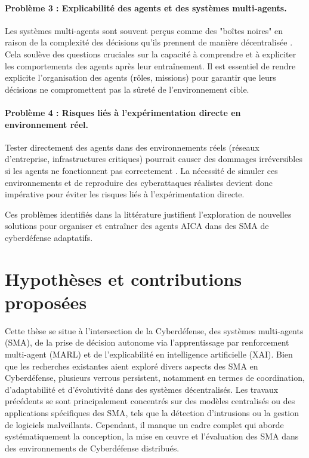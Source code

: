 \paragraph{Problème 3 : Explicabilité des agents et des systèmes multi-agents.}
Les systèmes multi-agents sont souvent perçus comme des "boîtes noires" en raison de la complexité des décisions qu'ils prennent de manière décentralisée \cite{Theron2018}. Cela soulève des questions cruciales sur la capacité à comprendre et à expliciter les comportements des agents après leur entraînement. Il est essentiel de rendre explicite l'organisation des agents (rôles, missions) pour garantir que leurs décisions ne compromettent pas la sûreté de l'environnement cible.

\paragraph{Problème 4 : Risques liés à l'expérimentation directe en environnement réel.}
Tester directement des agents dans des environnements réels (réseaux d'entreprise, infrastructures critiques) pourrait causer des dommages irréversibles si les agents ne fonctionnent pas correctement \cite{Calo2017}. La nécessité de simuler ces environnements et de reproduire des cyberattaques réalistes devient donc impérative pour éviter les risques liés à l'expérimentation directe.

Ces problèmes identifiés dans la littérature justifient l'exploration de nouvelles solutions pour organiser et entraîner des agents AICA dans des SMA de cyberdéfense adaptatifs.


\section{Hypothèses et contributions proposées}

Cette thèse se situe à l'intersection de la Cyberdéfense, des systèmes multi-agents (SMA), de la prise de décision autonome via l'apprentissage par renforcement multi-agent (MARL) et de l'explicabilité en intelligence artificielle (XAI). Bien que les recherches existantes aient exploré divers aspects des SMA en Cyberdéfense, plusieurs verrous persistent, notamment en termes de coordination, d'adaptabilité et d'évolutivité dans des systèmes décentralisés. Les travaux précédents se sont principalement concentrés sur des modèles centralisés ou des applications spécifiques des SMA, tels que la détection d'intrusions ou la gestion de logiciels malveillants. Cependant, il manque un cadre complet qui aborde systématiquement la conception, la mise en œuvre et l'évaluation des SMA dans des environnements de Cyberdéfense distribués.

